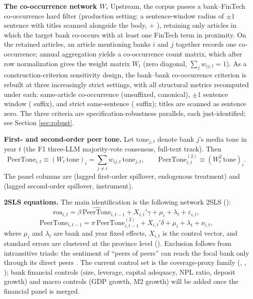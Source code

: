 \textbf{The co-occurrence network $W$.} Upstream, the corpus passes
a bank--FinTech co-occurrence hard filter (production setting: a
sentence-window radius of $\pm 1$ sentence with titles scanned
alongside the body,  +
), retaining only articles in which the
target bank co-occurs with at least one FinTech term in proximity.
On the retained articles, an article mentioning banks $i$ and $j$
together records one co-occurrence; annual aggregation yields a
co-occurrence count matrix, which after row normalization gives the
weight matrix $W_{t}$ (zero diagonal, $\sum_{j} w_{ij,t}=1$). As a
construction-criterion sensitivity design, the bank--bank
co-occurrence criterion is rebuilt at three increasingly strict
settings, with all structural metrics recomputed under each:
same-article co-occurrence (unsuffixed, canonical), $\pm 1$
sentence window ( suffix), and strict same-sentence
( suffix); titles are scanned as sentence zero. The
three criteria are specification-robustness parallels, each
just-identified; see Section \ref{sec:robust}.

\textbf{First- and second-order peer tone.} Let $\text{tone}_{j,t}$
denote bank $j$'s media tone in year $t$ (the F1 three-LLM
majority-vote consensus, full-text track). Then
\begin{equation}
\text{PeerTone}_{i,t} \equiv (W_{t}\,\text{tone})_{i}
= \sum_{j \neq i} w_{ij,t}\,\text{tone}_{j,t},
\qquad
\text{PeerTone}^{(2)}_{i,t} \equiv (W_{t}^{2}\,\text{tone})_{i}.
\label{eq:peertone}
\end{equation}
The panel columns are  (lagged
first-order spillover, endogenous treatment) and
 (lagged second-order spillover,
instrument).

\textbf{2SLS equations.} The main identification is the following
network 2SLS ():
\begin{equation}
\text{roa}_{i,t} = \beta\,\widehat{\text{PeerTone}}_{i,t-1}
 + X_{i,t}'\gamma + \mu_{i} + \lambda_{t} + \varepsilon_{i,t},
\label{eq:secondstage}
\end{equation}
\begin{equation}
\text{PeerTone}_{i,t-1} = \pi\,\text{PeerTone}^{(2)}_{i,t-1}
 + X_{i,t}'\delta + \mu_{i} + \lambda_{t} + \nu_{i,t},
\label{eq:firststage}
\end{equation}
where $\mu_{i}$ and $\lambda_{t}$ are bank and year fixed effects,
$X_{i,t}$ is the control vector, and standard errors are clustered
at the province level (). Exclusion follows from
intransitive triads: the sentiment of ``peers of peers'' can reach
the focal bank only through its direct peers
\parencite{bramoulle2009identification}. The current control set is
the coverage-proxy family (,
, ); bank financial controls
(size, leverage, capital adequacy, NPL ratio, deposit growth) and
macro controls (GDP growth, M2 growth) will be added once the
financial panel is merged.

